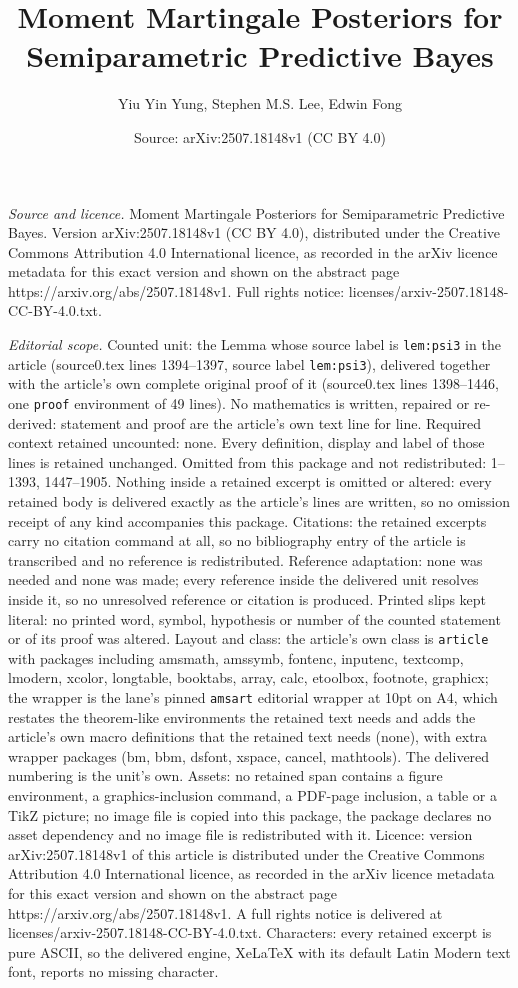 \documentclass[10pt,a4paper]{amsart}
\title[Moment Martingale Posteriors for Semiparametric Predictive B]{Moment Martingale Posteriors for Semiparametric Predictive Bayes}
\author{Yiu Yin Yung, Stephen M.S. Lee, Edwin Fong}
\date{Source: arXiv:2507.18148v1 (CC BY 4.0)}
\begin{document}
\maketitle

\noindent\emph{Source and licence.} Moment Martingale Posteriors for Semiparametric Predictive Bayes. Version arXiv:2507.18148v1 (CC BY 4.0), distributed under the Creative Commons Attribution 4.0 International licence, as recorded in the arXiv licence metadata for this exact version and shown on the abstract page https://arxiv.org/abs/2507.18148v1. Full rights notice: licenses/arxiv-2507.18148-CC-BY-4.0.txt.\par\smallskip

\noindent\textit{Editorial scope.} Counted unit: the Lemma whose source label is \texttt{lem:psi3} in the article (source0.tex lines 1394--1397, source label \texttt{lem:psi3}), delivered together with the article's own complete original proof of it (source0.tex lines 1398--1446, one \texttt{proof} environment of 49 lines). No mathematics is written, repaired or re-derived: statement and proof are the article's own text line for line. Required context retained uncounted: none. Every definition, display and label of those lines is retained unchanged. Omitted from this package and not redistributed: 1--1393, 1447--1905. Nothing inside a retained excerpt is omitted or altered: every retained body is delivered exactly as the article's lines are written, so no omission receipt of any kind accompanies this package. Citations: the retained excerpts carry no citation command at all, so no bibliography entry of the article is transcribed and no reference is redistributed. Reference adaptation: none was needed and none was made; every reference inside the delivered unit resolves inside it, so no unresolved reference or citation is produced. Printed slips kept literal: no printed word, symbol, hypothesis or number of the counted statement or of its proof was altered. Layout and class: the article's own class is \texttt{article} with packages including amsmath, amssymb, fontenc, inputenc, textcomp, lmodern, xcolor, longtable, booktabs, array, calc, etoolbox, footnote, graphicx; the wrapper is the lane's pinned \texttt{amsart} editorial wrapper at 10pt on A4, which restates the theorem-like environments the retained text needs and adds the article's own macro definitions that the retained text needs (none), with extra wrapper packages (bm, bbm, dsfont, xspace, cancel, mathtools). The delivered numbering is the unit's own. Assets: no retained span contains a figure environment, a graphics-inclusion command, a PDF-page inclusion, a table or a TikZ picture; no image file is copied into this package, the package declares no asset dependency and no image file is redistributed with it. Licence: version arXiv:2507.18148v1 of this article is distributed under the Creative Commons Attribution 4.0 International licence, as recorded in the arXiv licence metadata for this exact version and shown on the abstract page https://arxiv.org/abs/2507.18148v1. A full rights notice is delivered at licenses/arxiv-2507.18148-CC-BY-4.0.txt. Characters: every retained excerpt is pure ASCII, so the delivered engine, XeLaTeX with its default Latin Modern text font, reports no missing character.
\end{document}
